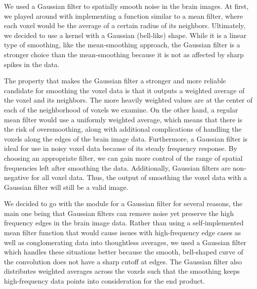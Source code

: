 
\par \indent We used a Gaussian filter to spatially smooth noise in the brain 
images. At first, we played around with implementing a function similar 
to a mean filter, where each voxel would be the average of a certain radius 
of its neighbors. Ultimately, we decided to use a kernel with a Gaussian 
(bell-like) shape. While it is a linear type of smoothing, like the 
mean-smoothing approach, the Gaussian filter is a stronger choice than the 
mean-smoothing because it is not as affected by sharp spikes in the data. 

\par The property that makes the Gaussian filter a stronger and more 
reliable candidate for smoothing the voxel data is that it outputs a weighted 
average of the voxel and its neighbors. The more heavily weighted values are 
at the center of each of the neighborhood of voxels we examine. On the other 
hand, a regular mean filter would use a uniformly weighted average, which 
means that there is the risk of oversmoothing, along with additional 
complications of handling the voxels along the edges of the brain image data. 
Furthermore, a Gaussian filter is ideal for use in noisy voxel data because of 
its steady frequency response. By choosing an appropriate filter, we can 
gain more control of the range of spatial frequencies left after smoothing 
the data. Additionally, Gaussian filters are non-negative for all voxel data. 
Thus, the output of smoothing the voxel data with a Gaussian filter will still 
be a valid image. 

\par We decided to go with the module for a Gaussian filter for several 
reasons, the main one being that Gaussian filters can remove noise yet 
preserve the high frequency edges in the brain image data. Rather than using a 
self-implemented mean filter function that would cause issues with 
high-frequency edge cases as well as conglomerating data into thoughtless 
averages, we used a Gaussian filter which handles these situations better 
because the smooth, bell-shaped curve of the convolution does not have a sharp 
cutoff at edges. The Gaussian filter also distributes weighted averages across 
the voxels such that the smoothing keeps high-frequency data points into 
consideration for the end product.
